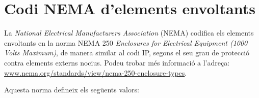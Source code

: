 \section{Codi NEMA d'elements envoltants}
 

La \textit{National Electrical Manufacturers Association} (NEMA)
codifica els elements envoltants en la norma NEMA 250 \textit{Enclosures for Electrical Equipment (1000 Volts Maximum)}, de manera similar al codi IP, segons el seu grau de protecció contra elements externs nocius. Podeu trobar més informació a l'adreça: \href{https://www.nema.org/standards/view/nema-250-enclosure-types}{www.nema.org/standards/view/nema-250-enclosure-types}.

Aquesta norma defineix els següents valors:

